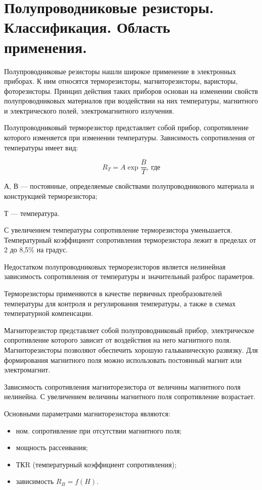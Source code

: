 \documentclass[unicode, 12pt, a4paper, oneside]{article}
\begin{document}
\section{Полупроводниковые резисторы. Классификация. Область применения.}

Полупроводниковые резисторы нашли широкое применение в электронных приборах. К ним относятся терморезисторы, магниторезисторы, варисторы, фоторезисторы. Принцип действия таких приборов основан на изменении свойств полупроводниковых материалов при воздействии на них температуры, магнитного и электрического полей, электромагнитного излучения.

Полупроводниковый терморезистор представляет собой прибор, сопротивление которого изменяется при изменении температуры. Зависимость сопротивления от температуры имеет вид:

\begin{equation}
R_{T}=A\exp{\frac{B}{T}}\text{, где}
\end{equation}
\par А, В --- постоянные, определяемые свойствами полупроводникового материала и конструкцией терморезистора;
\par Т --- температура.

С увеличением температуры сопротивление терморезистора уменьшается. Температурный коэффициент сопротивления терморезистора лежит в пределах от 2 до 8,5\% на градус.

Недостатком полупроводниковых терморезисторов является нелинейная зависимость сопротивления от температуры и значительный разброс параметров.

Терморезисторы применяются в качестве первичных преобразователей температуры для контроля и регулирования температуры, а также в схемах температурной компенсации.

Магниторезистор представляет собой полупроводниковый прибор, электрическое сопротивление которого зависит от воздействия на него магнитного поля. Магниторезисторы позволяют обеспечить хорошую гальваническую развязку. Для формирования магнитного поля можно использовать постоянный магнит или электромагнит.

Зависимость сопротивления магниторезистора от величины магнитного поля нелинейна. С увеличением величины магнитного поля сопротивление возрастает.

Основными параметрами магниторезистора являются:

\begin{itemize}
\item ном. сопротивление при отсутствии магнитного поля;
\item мощность рассеивания;
\item ТКR (температурный коэффициент сопротивления);
\item зависимость $R_{B} = f(H)$.
\end{itemize}
\end{document}
